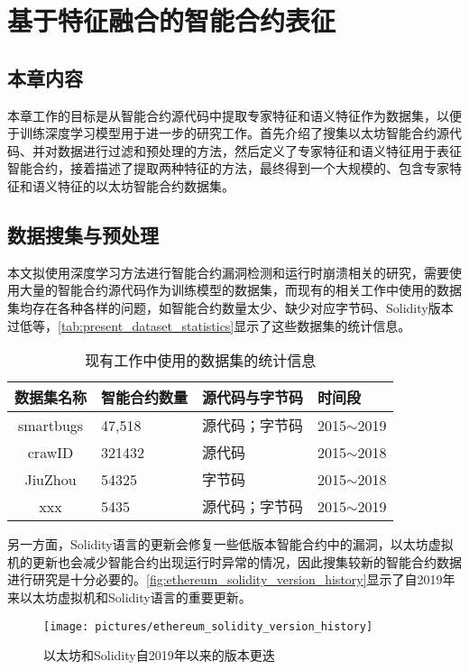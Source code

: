 \chapter{基于特征融合的智能合约表征}
\section{本章内容}
本章工作的目标是从智能合约源代码中提取专家特征和语义特征作为数据集，以便于训练深度学习模型用于进一步的研究工作。首先介绍了搜集以太坊智能合约源代码、并对数据进行过滤和预处理的方法，然后定义了专家特征和语义特征用于表征智能合约，接着描述了提取两种特征的方法，最终得到一个大规模的、包含专家特征和语义特征的以太坊智能合约数据集。
\section{数据搜集与预处理}
本文拟使用深度学习方法进行智能合约漏洞检测和运行时崩溃相关的研究，需要使用大量的智能合约源代码作为训练模型的数据集，而现有的相关工作中使用的数据集均存在各种各样的问题，如智能合约数量太少、缺少对应字节码、Solidity版本过低等，\autoref{tab:present_dataset_statistics}显示了这些数据集的统计信息。
\begin{table}[htbp]
    \caption{\label{tab:present_dataset_statistics}现有工作中使用的数据集的统计信息}
    \small
    \renewcommand{\arraystretch}{1.5}
    \begin{tabularx}{\linewidth}{cX<{\centering}X<{\centering}X<{\centering}}
        \hline
    数据集名称     & 智能合约数量 & 源代码与字节码 & 时间段            \\ \hline
    smartbugs & 47,518  & 源代码；字节码 & 2015$\sim$2019 \\
    crawID    & 321432 & 源代码     & 2015$\sim$2018 \\
    JiuZhou   & 54325  & 字节码     & 2015$\sim$2018 \\
    xxx       & 5435   & 源代码；字节码 & 2015$\sim$2019  \\  \hline
    \end{tabularx}
\end{table}
另一方面，Solidity语言的更新会修复一些低版本智能合约中的漏洞，以太坊虚拟机的更新也会减少智能合约出现运行时异常的情况，因此搜集较新的智能合约数据进行研究是十分必要的。\autoref{fig:ethereum_solidity_version_history}显示了自2019年来以太坊虚拟机和Solidity语言的重要更新。
\begin{figure}[htbp]
    \centering
    \texttt{[image: pictures/ethereum\_solidity\_version\_history]}
    \caption{\label{fig:ethereum_solidity_version_history}以太坊和Solidity自2019年以来的版本更迭}
\end{figure}
